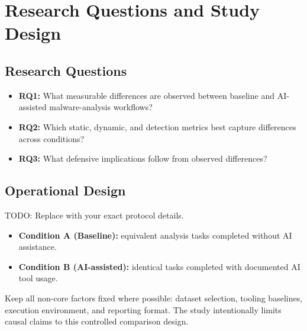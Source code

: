 \section{Research Questions and Study Design}


\subsection{Research Questions}
\begin{itemize}
  \item \textbf{RQ1:} What measurable differences are observed between baseline and AI-assisted malware-analysis workflows?
  \item \textbf{RQ2:} Which static, dynamic, and detection metrics best capture differences across conditions?
  \item \textbf{RQ3:} What defensive implications follow from observed differences?
\end{itemize}

\subsection{Operational Design}
TODO: Replace with your exact protocol details.
\begin{itemize}
  \item \textbf{Condition A (Baseline):} equivalent analysis tasks completed without AI assistance.
  \item \textbf{Condition B (AI-assisted):} identical tasks completed with documented AI tool usage.
\end{itemize}

Keep all non-core factors fixed where possible: dataset selection, tooling baselines,
execution environment, and reporting format. The study intentionally limits causal
claims to this controlled comparison design.
